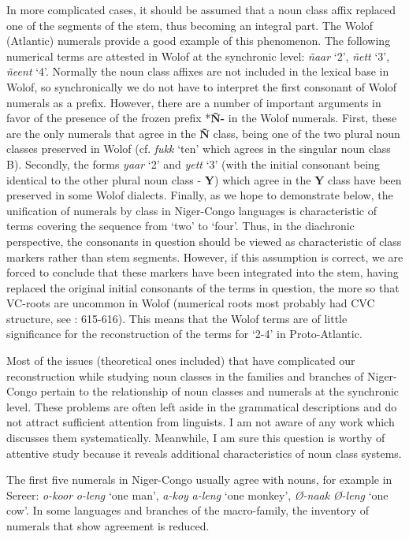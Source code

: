 In more complicated cases, it should be assumed that a noun class affix replaced one of the segments of the stem, thus becoming an integral part. The Wolof (Atlantic) numerals provide a good example of this phenomenon. The following numerical terms are attested in Wolof at the synchronic level: \textit{ñaar} ‘2’, \textit{ñett} ‘3’, \textit{ñeent} ‘4’. Normally the noun class affixes are not included in the lexical base in Wolof, so synchronically we do not have to interpret the first consonant of Wolof numerals as a prefix. However, there are a number of important arguments in favor of the presence of the frozen prefix *\textbf{Ñ-} in the Wolof numerals. First, these are the only numerals that agree in the \textbf{Ñ} class, being one of the two plural noun classes preserved in Wolof (cf. \textit{fukk} ‘ten’ which agrees in the singular noun class B). Secondly, the forms \textit{yaar} ‘2’ and \textit{yett} ‘3’ (with the initial consonant being identical to the other plural noun class - \textbf{Y}) which agree in the \textbf{Y} class have been preserved in some Wolof dialects. Finally, as we hope to demonstrate below, the unification of numerals by class in Niger-Congo languages is characteristic of terms covering the sequence from ‘two’ to ‘four’. Thus, in the diachronic perspective, the consonants in question should be viewed as characteristic of class markers rather than stem segments. However, if this assumption is correct, we are forced to conclude that these markers have been integrated into the stem, having replaced the original initial consonants of the terms in question, the more so that VC-roots are uncommon in Wolof (numerical roots most probably had CVC structure, see \citealt{PozdniakovRobert2015}: 615-616). This means that the Wolof terms are of little significance for the reconstruction of the terms for ‘2-4’ in Proto-Atlantic.

Most of the issues (theoretical ones included) that have complicated our reconstruction while studying noun classes in the families and branches of Niger-Congo pertain to the relationship of noun classes and numerals at the synchronic level. These problems are often left aside in the grammatical descriptions and do not attract sufficient attention from linguists. I am not aware of any work which discusses them systematically. Meanwhile, I am sure this question is worthy of attentive study because it reveals additional characteristics of noun class systems. 

The first five numerals in Niger-Congo usually agree with nouns, for example in Sereer: \textit{o-koor} \textit{o-leng} ‘one man’, \textit{a-koy} \textit{a-leng} ‘one monkey’, \textit{Ø-naak} \textit{Ø-leng} ‘one cow’.  In some languages and branches of the macro-family, the inventory of numerals that show agreement is reduced. 

